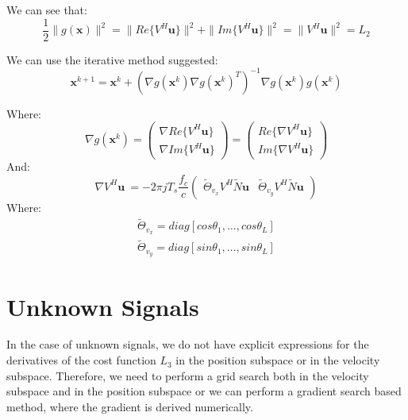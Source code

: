 \documentclass[10pt,a4paper]{report}
\begin{document}
We can see that:
\begin{equation}
\frac{1}{2}\|g(\mathbf{x})\|^2=\|Re\{V^H \mathbf{u}\}\|^2+\|Im\{V^H \mathbf{u}\}\|^2 = \|V^H\mathbf{u} \|^2 = L_2
\end{equation}

We can use the iterative method suggested:
\begin{equation}
\mathbf{x}^{k+1}=\mathbf{x}^k +\left(\nabla g(\mathbf{x}^k)\nabla g(\mathbf{x}^k)^T\right)^{-1} \nabla g(\mathbf{x}^k) g(\mathbf{x}^k)
\end{equation}

Where:
\begin{equation}
\nabla g(\mathbf{x}^k) = 
\begin{pmatrix} 
\nabla Re\{V^H\mathbf{u}\} \\ \nabla Im\{V^H\mathbf{u}\} 
\end{pmatrix}=
\begin{pmatrix} 
Re \{\nabla V^H\mathbf{u}\} \\ Im\{\nabla V^H\mathbf{u}\} 
\end{pmatrix}
\end{equation}
And:
\begin{equation}
\nabla V^H\mathbf{u}\ = -2 \pi j T_s \frac{f_c}{c}
\begin{pmatrix}  
\tilde{\Theta}_{v_x} V^H \tilde{N} \mathbf{u} &
\tilde{\Theta}_{v_y} V^H \tilde{N} \mathbf{u}
\end{pmatrix}
\end{equation}
Where: 
\begin{eqnarray}
\tilde{\Theta}_{v_x} = diag \left[cos \theta_1, \dots ,cos \theta_L \right] \\
\tilde{\Theta}_{v_y} = diag \left[sin \theta_1, \dots ,sin \theta_L \right]
\end{eqnarray}

\section{Unknown Signals}
In the case of unknown signals, we do not have explicit expressions for the derivatives of the cost function $L_3$ in the position subspace or in the velocity subspace.
Therefore, we need to perform a grid search both in the velocity subspace and in the position subspace or we can perform a gradient search based method, where the gradient is derived numerically.
\end{document}
